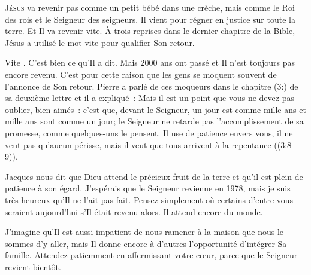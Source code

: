 



\lettrine{J}{ésus} va revenir \ocadr pas comme un petit bébé dans une crèche,
 mais comme le Roi des rois et le Seigneur des seigneurs.
 Il vient pour régner en justice sur toute la terre. Et Il va revenir vite.
 À trois reprises dans le dernier chapitre de la Bible, Jésus a utilisé le mot
 \og vite \fg{} pour qualifier Son retour.

\og Vite \fg{}. C'est bien ce qu'Il a dit.
 Mais 2000 ans ont passé et Il n'est toujours pas encore revenu.
 C'est pour cette raison que les gens se moquent souvent de l'annonce
 de Son retour. Pierre a parlé de ces moqueurs dans le chapitre
 (3:)
 de sa deuxième lettre et il a expliqué~:
 \og Mais il est un point que vous ne devez pas oublier, bien-aimés~:
 c'est que, devant le Seigneur, un jour est comme mille ans et mille ans
 sont comme un jour; le Seigneur ne retarde pas l'accomplissement
 de sa promesse, comme quelques-uns le pensent.
 Il use de patience envers vous, il ne veut pas qu'aucun périsse,
 mais il veut que tous arrivent à la repentance \fg{}
 ((3:8-9)).


Jacques nous dit que Dieu attend le précieux fruit de la terre
 et qu'il est plein de patience à son égard.
 J'espérais que le Seigneur revienne en 1978, mais je suis très heureux
 qu'Il ne l'ait pas fait. Pensez simplement où certains d'entre vous seraient
 aujourd'hui s'Il était revenu alors. Il attend encore du monde.

J'imagine qu'Il est aussi impatient de nous ramener à la maison
 que nous le sommes d'y aller, mais Il donne encore à d'autres l'opportunité
 d'intégrer Sa famille. Attendez patiemment en affermissant votre c\oe{}ur,
 parce que le Seigneur revient bientôt.

\dvrule





